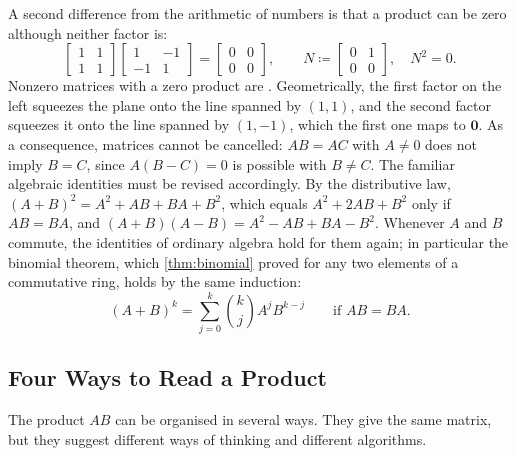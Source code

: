 A second difference from the arithmetic of numbers is that a product can be zero although neither factor is:
\[
\begin{bmatrix}1&1\\1&1\end{bmatrix}\begin{bmatrix}1&-1\\-1&1\end{bmatrix}=\begin{bmatrix}0&0\\0&0\end{bmatrix},\qquad N\coloneqq\begin{bmatrix}0&1\\0&0\end{bmatrix},\quad N^2=0 .
\]
Nonzero matrices with a zero product are . Geometrically, the first factor on the left squeezes the plane onto the line spanned by $(1,1)$, and the second factor squeezes it onto the line spanned by $(1,-1)$, which the first one maps to $\mathbf 0$. As a consequence, matrices cannot be cancelled: $AB=AC$ with $A\ne0$ does not imply $B=C$, since $A(B-C)=0$ is possible with $B\ne C$. The familiar algebraic identities must be revised accordingly. By the distributive law, $(A+B)^2=A^2+AB+BA+B^2$, which equals $A^2+2AB+B^2$ only if $AB=BA$, and $(A+B)(A-B)=A^2-AB+BA-B^2$. Whenever $A$ and $B$ commute, the identities of ordinary algebra hold for them again; in particular the binomial theorem, which \cref{thm:binomial} proved for any two elements of a commutative ring, holds by the same induction:
\[
(A+B)^k=\sum_{j=0}^k\binom kjA^jB^{k-j}\qquad\text{if }AB=BA .
\]

\subsection{Four Ways to Read a Product}

The product $AB$ can be organised in several ways. They give the same matrix, but they suggest different ways of thinking and different algorithms.

